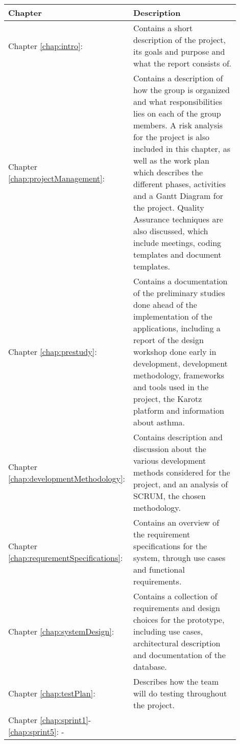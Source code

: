 \begin{table}
	\begin{center}
	\begin{tabular}{|p{0.3\linewidth}|p{0.6\linewidth}|}   
		\hline   
		\bf{Chapter} & \bf{Description} \\ 
		\hline
			Chapter \ref{chap:intro}: \nameref{chap:intro} &
			 Contains a short description of the project, its goals and purpose and what the 
			 report consists of. \\
		\hline
			Chapter \ref{chap:projectManagement}: \nameref{chap:projectManagement} & 
			Contains a description of how the group is organized and what responsibilities 
			lies on each of the group members. A risk analysis for the project is also included
			 in this chapter, as well as the work plan which describes the different phases, 
			 activities and a Gantt Diagram for the project. Quality Assurance
			 techniques are also discussed, which include meetings, coding templates and document templates. \\
		\hline
			Chapter \ref{chap:prestudy}: \nameref{chap:prestudy} & 
			Contains a documentation of the preliminary studies done ahead of the implementation of the 
			applications, including a report of the design workshop done early in development,
			development methodology, frameworks and tools used in the project, the Karotz platform 
			and information about asthma. \\
		\hline
			Chapter \ref{chap:developmentMethodology}: \nameref{chap:developmentMethodology} &
			Contains description and discussion about the various development methods considered
			for the project, and an analysis of SCRUM, the chosen methodology. \\
		\hline
			Chapter \ref{chap:requrementSpecifications}: \nameref{chap:requrementSpecifications} &
			Contains an overview of the requirement specifications for the system, through use cases
			and functional requirements. \\
		\hline
			Chapter \ref{chap:systemDesign}: \nameref{chap:systemDesign} & 
			Contains a collection of requirements and design choices for the prototype, 
			including use cases, architectural description and documentation of the database. \\
		\hline
			Chapter \ref{chap:testPlan}: \nameref{chap:testPlan} & 
			Describes how the team will do testing throughout the project. \\
		\hline
			Chapter \ref{chap:sprint1}-\ref{chap:sprint5}: \nameref{chap:sprint1}-\nameref{chap:sprint5} & 

\end{tabular}
\end{center}
\end{table}
